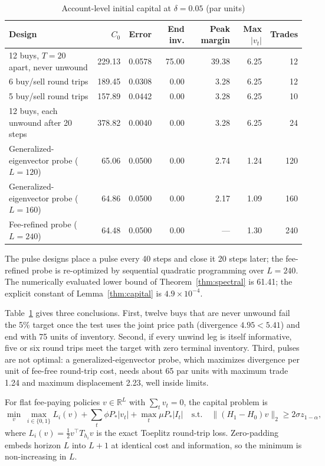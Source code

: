 \documentclass[12pt]{article}
\theoremstyle{definition}
\theoremstyle{remark}
\newcommand{\R}{\mathbb{R}}
\begin{document}
\begin{table}[t]\centering\small
\begin{threeparttable}
\caption{Account-level initial capital at $\delta=0.05$ (par units)}\label{tab:ledger}
\setlength{\tabcolsep}{4pt}
\begin{tabular}{lrrrrrr}
\toprule
Design & $C_0$ & Error & End inv. & Peak margin & Max $|v_t|$ & Trades\\
\midrule
12 buys, $T=20$ apart, never unwound & 229.13 & 0.0578 & 75.00 & 39.38 & 6.25 & 12\\
6 buy/sell round trips & 189.45 & 0.0308 & 0.00 & 3.28 & 6.25 & 12\\
5 buy/sell round trips & 157.89 & 0.0442 & 0.00 & 3.28 & 6.25 & 10\\
12 buys, each unwound after 20 steps & 378.82 & 0.0040 & 0.00 & 3.28 & 6.25 & 24\\
Generalized-eigenvector probe ($L=120$) & 65.06 & 0.0500 & 0.00 & 2.74 & 1.24 & 120\\
Generalized-eigenvector probe ($L=160$) & 64.86 & 0.0500 & 0.00 & 2.17 & 1.09 & 160\\
Fee-refined probe ($L=240$) & 64.48 & 0.0500 & 0.00 & --- & 1.30 & 240\\
\bottomrule
\end{tabular}
\begin{tablenotes}\footnotesize\item The pulse designs place a pulse every 40 steps and close it 20 steps later; the fee-refined probe is re-optimized by sequential quadratic programming over $L=240$. The numerically evaluated lower bound of Theorem~\ref{thm:spectral} is 61.41; the explicit constant of Lemma~\ref{thm:capital} is $4.9\times10^{-4}$.\end{tablenotes}
\end{threeparttable}
\end{table}

Table~\ref{tab:ledger} gives three conclusions. First, twelve buys that are never unwound fail the 5\% target once the test uses the joint price path (divergence $4.95<5.41$) and end with 75 units of inventory. Second, if every unwind leg is itself informative, five or six round trips meet the target with zero terminal inventory. Third, pulses are not optimal: a generalized-eigenvector probe, which maximizes divergence per unit of fee-free round-trip cost, needs about 65 par units with maximum trade 1.24 and maximum displacement 2.23, well inside limits.

For flat fee-paying policies $v\in\R^L$ with $\sum_tv_t=0$, the capital problem is
\begin{equation}\label{eq:capprob}
\min_v\ \max_{i\in\{0,1\}}L_i(v)+\sum_t\phi P_*|v_t|+\max_t\mu P_*|I_t|\quad\text{s.t.}\quad\|(H_1-H_0)v\|_2\ge2\sigma z_{1-\alpha},
\end{equation}
where $L_i(v)=\tfrac12v^\top T_{h_i}v$ is the exact Toeplitz round-trip loss. Zero-padding embeds horizon $L$ into $L+1$ at identical cost and information, so the minimum is non-increasing in $L$.
\end{document}
